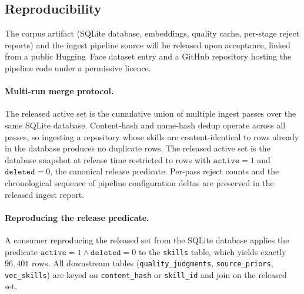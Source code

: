 \subsection{Reproducibility}
\label{app:reproducibility}

The corpus artifact (SQLite database, embeddings, quality cache,
per-stage reject reports) and the ingest pipeline source will be
released upon acceptance, linked from a public Hugging~Face dataset
entry and a GitHub repository hosting the pipeline code under a
permissive licence.

\paragraph{Multi-run merge protocol.}
The released active set is the cumulative union of multiple
ingest passes over the same SQLite database.  Content-hash and
name-hash dedup operate
across all passes, so ingesting a repository whose skills are
content-identical to rows already in the database produces no
duplicate rows.  The released active set is the database snapshot
at release time restricted to rows with $\mathtt{active}=1$ and
$\mathtt{deleted}=0$, the canonical release predicate.  Per-pass
reject counts and the chronological sequence of pipeline
configuration deltas are preserved in the released ingest report.

\paragraph{Reproducing the release predicate.}
A consumer reproducing the released set from the SQLite database
applies the predicate $\mathtt{active}=1 \wedge \mathtt{deleted}=0$
to the \texttt{skills} table, which yields exactly $96{,}401$
rows.  All downstream tables (\texttt{quality\_judgments},
\texttt{source\_priors}, \texttt{vec\_skills}) are keyed on
\texttt{content\_hash} or \texttt{skill\_id} and join on the
released set.
